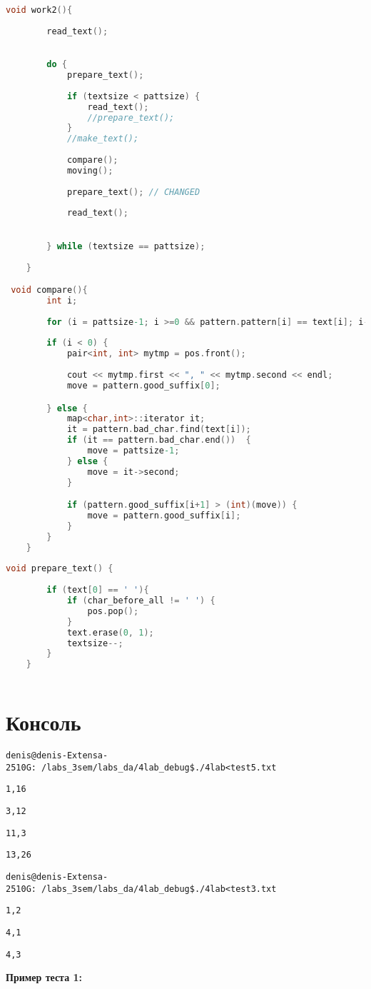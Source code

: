 \begin{lstlisting}[language=C]
void work2(){
       
        read_text();
        

        do {
            prepare_text();
            
            if (textsize < pattsize) {
                read_text();
                //prepare_text();
            }
            //make_text();
            
            compare();
            moving();
            
            prepare_text(); // CHANGED
            
            read_text();
            

        } while (textsize == pattsize);
    
    }

 void compare(){
        int i;
        
        for (i = pattsize-1; i >=0 && pattern.pattern[i] == text[i]; i--);
         
        if (i < 0) {
            pair<int, int> mytmp = pos.front();
            
            cout << mytmp.first << ", " << mytmp.second << endl;
            move = pattern.good_suffix[0];

        } else {
            map<char,int>::iterator it;
            it = pattern.bad_char.find(text[i]);
            if (it == pattern.bad_char.end())  {
                move = pattsize-1;
            } else {
                move = it->second;
            }

            if (pattern.good_suffix[i+1] > (int)(move)) {
                move = pattern.good_suffix[i];
            } 
        }
    }
    
void prepare_text() {
        
        if (text[0] == ' '){
            if (char_before_all != ' ') {
                pos.pop();
            }
            text.erase(0, 1);
            textsize--;         
        }    
    }
    
\end{lstlisting}


\pagebreak

\section{Консоль}
\begin{alltt}
denis@denis-Extensa-2510G:~/labs_3sem/labs_da/4lab_debug\$ ./4lab < test5.txt 

1, 16

3, 12

11, 3

13, 26

denis@denis-Extensa-2510G:~/labs_3sem/labs_da/4lab_debug\$ ./4lab < test3.txt 

1, 2

4, 1

4, 3

\end{alltt}
\textbf{Пример теста 1:}

